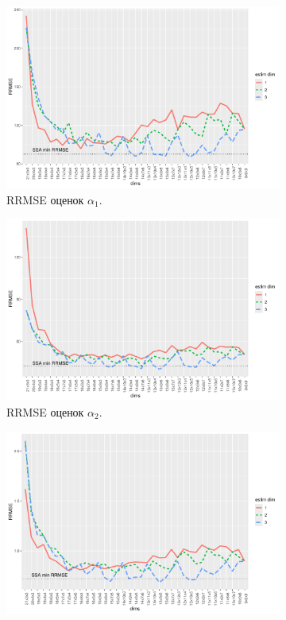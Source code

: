 \documentclass[specialist,
  substylefile=spbu_report.rtx,
subf,href,colorlinks=true, 12pt]{disser}
\theoremstyle{plain}
\theoremstyle{definition}
\theoremstyle{remark}
\begin{document}
\begin{figure}[!ht]
  \centering
  \begin{subfigure}{0.49\linewidth}
    \includegraphics[width=\linewidth, height=0.167\textheight]{rate1_dims.pdf}
    \caption{RRMSE оценок $\alpha_1$.}
    \label{fig:rate1_dims}
  \end{subfigure}
  \begin{subfigure}{0.49\linewidth}
    \includegraphics[width=\linewidth, height=0.167\textheight]{rate2_dims.pdf}
    \caption{RRMSE оценок $\alpha_2$.}
    \label{fig:rate2_dims}
  \end{subfigure}
  \begin{subfigure}{0.49\linewidth}
    \includegraphics[width=\linewidth, height=0.167\textheight]{freq1_dims.pdf}

\end{subfigure}
\end{figure}
\end{document}
